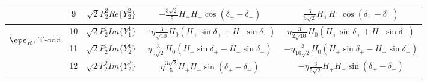 {\begin{tiny}
\begin{table}
\begin{center}
\begin{tabular}{c|c|c|c|c}
 &9 & $\sqrt{2}P^2_2 Re\{Y^2_2\} $ & $ -\frac{3\sqrt{2}}{5} H_+ H_- \cos(\delta_+ - \delta_-) $ &  $ \frac{3}{5\sqrt{2}} H_+ H_- \cos(\delta_+ - \delta_-) $ \\ \hline \hline
 \multirow{3}{*}{ \begin{sideways} $\eps_R$,\; T-odd \end{sideways}}&10 & $\sqrt{2}P^1_2 Im\{Y^1_1 \}$ & $  -\eta \frac{3}{\sqrt{10}} H_0  \left( H_+ \sin \delta_+ + H_- \sin \delta_-\right)     $  & $  \eta \frac{3}{2\sqrt{10}} H_0  \left( H_+ \sin \delta_+ + H_- \sin \delta_-\right)   $ \\ \cline{2-5}
 &11 & $\sqrt{2}P^1_2 Im\{Y^1_2\} $ & $  \eta \frac{3}{5\sqrt{2}} H_0  \left( H_+ \sin \delta_+ - H_- \sin \delta_-\right)  $ &  $  -\eta \frac{3}{10\sqrt{2}} H_0  \left( H_+ \sin \delta_+ - H_- \sin \delta_-\right) $ \\ \cline{2-5}
 &12 & $\sqrt{2} P^2_2 Im\{Y^2_2\} $ & $  \eta \frac{3\sqrt{2}}{5} H_+ H_- \sin(\delta_+ - \delta_-) $  & $  -\eta \frac{3}{5\sqrt{2}} H_+ H_- \sin(\delta_+ - \delta_-) $ \\\hline
\end{tabular}
\end{center}
\end{table}
\end{tiny}


}



